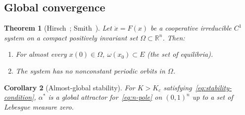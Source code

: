 \documentclass[11pt,a4paper]{article}
\newtheorem{theorem}{Theorem}[section]
\newtheorem{corollary}[theorem]{Corollary}
\theoremstyle{definition}
\newcommand{\R}{\mathbb{R}}
\begin{document}
\subsection{Global convergence}

\begin{theorem}[Hirsch~\cite{hirsch1988}; Smith~\cite{smith1995}]\label{thm:hirsch}
Let $\dot{x} = F(x)$ be a cooperative irreducible $C^1$ system on a compact positively invariant set $\Omega \subset \R^n$. Then:
\begin{enumerate}[label=(\alph*)]
\item For almost every $x(0) \in \Omega$, $\omega(x_0) \subset E$ (the set of equilibria).
\item The system has no nonconstant periodic orbits in $\Omega$.
\end{enumerate}
\end{theorem}

\begin{corollary}[Almost-global stability]\label{cor:rational}
For $K > K_c$ satisfying~\eqref{eq:stability-condition}, $\alpha^*$ is a global attractor for~\eqref{eq:n-pole} on $(0,1)^n$ up to a set of Lebesgue measure zero.
\end{corollary}
\end{document}
